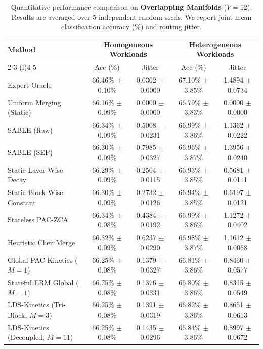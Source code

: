 \begin{table}[t]
\caption{Quantitative performance comparison on \textbf{Overlapping Manifolds} ($V=12$). Results are averaged over 5 independent random seeds. We report joint mean classification accuracy (\%) and routing jitter.}
\label{tab:overlapping_results}
\vskip 0.15in
\begin{center}
\begin{small}
\begin{sc}
\setlength{\tabcolsep}{4.5pt}
\begin{tabular}{lcccc}
\toprule
Method & \multicolumn{2}{c}{Homogeneous Workloads} & \multicolumn{2}{c}{Heterogeneous Workloads} \\
\cmidrule(r){2-3} \cmidrule(l){4-5}
& Acc (\%) & Jitter & Acc (\%) & Jitter \\
\midrule
Expert Oracle & 66.46\% $\pm$ 0.10\% & 0.0302 $\pm$ 0.0000 & 67.10\% $\pm$ 3.85\% & 1.4894 $\pm$ 0.0734 \\
Uniform Merging (Static) & 66.16\% $\pm$ 0.09\% & 0.0000 $\pm$ 0.0000 & 66.79\% $\pm$ 3.83\% & 0.0000 $\pm$ 0.0000 \\
\midrule
SABLE (Raw) & 66.34\% $\pm$ 0.09\% & 0.5008 $\pm$ 0.0231 & 66.99\% $\pm$ 3.86\% & 1.1362 $\pm$ 0.0222 \\
SABLE (SEP) & 66.30\% $\pm$ 0.09\% & 0.7985 $\pm$ 0.0327 & 66.96\% $\pm$ 3.87\% & 1.3956 $\pm$ 0.0240 \\
Static Layer-Wise Decay & 66.29\% $\pm$ 0.09\% & 0.2504 $\pm$ 0.0115 & 66.93\% $\pm$ 3.85\% & 0.5681 $\pm$ 0.0111 \\
Static Block-Wise Constant & 66.30\% $\pm$ 0.09\% & 0.2732 $\pm$ 0.0126 & 66.94\% $\pm$ 3.85\% & 0.6197 $\pm$ 0.0121 \\
Stateless PAC-ZCA & 66.34\% $\pm$ 0.08\% & 0.4384 $\pm$ 0.0192 & 66.99\% $\pm$ 3.86\% & 1.1272 $\pm$ 0.0402 \\
Heuristic ChemMerge & 66.32\% $\pm$ 0.09\% & 0.6237 $\pm$ 0.0290 & 66.98\% $\pm$ 3.87\% & 1.1612 $\pm$ 0.0068 \\
\midrule
Global PAC-Kinetics ($M=1$) & 66.25\% $\pm$ 0.08\% & 0.1379 $\pm$ 0.0327 & 66.81\% $\pm$ 3.86\% & 0.8460 $\pm$ 0.0577 \\
Stateful ERM Global ($M=1$) & 66.25\% $\pm$ 0.08\% & 0.1376 $\pm$ 0.0331 & 66.80\% $\pm$ 3.86\% & 0.8315 $\pm$ 0.0549 \\
\midrule
LDS-Kinetics (Tri-Block, $M=3$) & 66.25\% $\pm$ 0.08\% & 0.1391 $\pm$ 0.0319 & 66.82\% $\pm$ 3.86\% & 0.8651 $\pm$ 0.0613 \\
LDS-Kinetics (Decoupled, $M=11$) & 66.25\% $\pm$ 0.08\% & 0.1435 $\pm$ 0.0296 & 66.84\% $\pm$ 3.86\% & 0.8997 $\pm$ 0.0672 \\

\end{tabular}
\end{sc}
\end{small}
\end{center}
\end{table}
